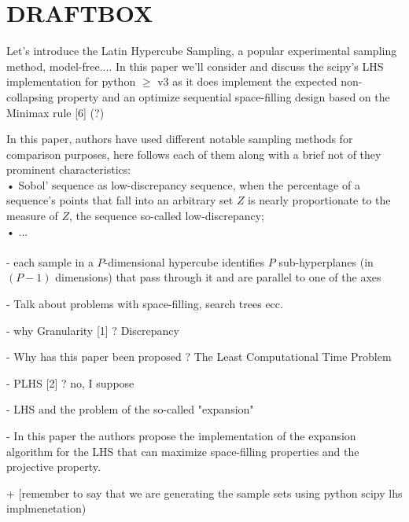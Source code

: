 \documentclass{article}
\begin{document}
\section*{DRAFTBOX}
Let's introduce the Latin Hypercube Sampling, a popular experimental sampling method, model-free....
In this paper we'll consider and discuss the scipy's LHS implementation for python $\geq$ v3 as it does implement the expected non-collapsing property and an optimize sequential space-filling design based on the Minimax rule [6] (?)

In this paper, authors have used different notable sampling methods for comparison purposes, here follows each of them along with a brief not of they prominent characteristics: \\
• Sobol' sequence as low-discrepancy sequence, when the percentage of a sequence's points that fall into an arbitrary set $Z$ is nearly proportionate to the measure of $Z$, the sequence so-called low-discrepancy;\\
• ...
\\
\\

- each sample in a $P$-dimensional hypercube identifies $P$ sub-hyperplanes (in $(P-1)$ dimensions) that pass through it and are parallel to one of the axes

- Talk about problems with space-filling, search trees ecc.

- why Granularity [1] ? Discrepancy

- Why has this paper been proposed ? The Least Computational Time Problem

- PLHS [2] ? no, I suppose 

- LHS and the problem of the so-called "expansion"

- In this paper the authors propose the implementation of the expansion algorithm for the LHS that can maximize space-filling properties and the projective property.

+ [remember to say that we are generating the sample sets using python scipy lhs implmenetation)

\printbibliography
\end{document}

